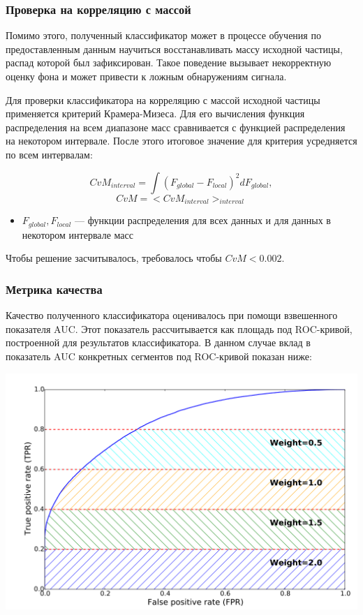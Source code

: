 \documentclass[14pt]{extarticle}
\begin{document}
\label{mass_metrics}
\subsubsection{Проверка на корреляцию с массой}
Помимо этого, полученный классификатор может в процессе обучения по предоставленным данным научиться восстанавливать массу исходной частицы, распад которой был зафиксирован. Такое поведение вызывает некорректную оценку фона и может привести к ложным обнаружениям сигнала.

Для проверки классификатора на корреляцию с массой исходной частицы применяется критерий Крамера-Мизеса. Для его вычисления функция распределения на всем диапазоне масс сравнивается с функцией распределения на некотором интервале. После этого итоговое значение для критерия усредняется по всем интервалам:

\begin{equation*}
	CvM_{interval} = \int (F_{global} - F_{local})^2 dF_{global},
\end{equation*}
\begin{equation*}
	CvM = <CvM_{interval}>_{interval}
\end{equation*}
\begin{itemize}
	\item $F_{global}, F_{local}$ — функции распределения для всех данных и для данных в некотором интервале масс
\end{itemize}
Чтобы решение засчитывалось, требовалось чтобы $CvM < 0.002$.

\subsubsection{Метрика качества}
Качество полученного классификатора оценивалось при помощи взвешенного показателя AUC. Этот показатель рассчитывается как площадь под ROC-кривой, построенной для результатов классификатора. В данном случае вклад в показатель AUC конкретных сегментов под ROC-кривой показан ниже:

\begin{center}
	\includegraphics[scale=0.8]{auc.png}
\end{center}
\end{document}
